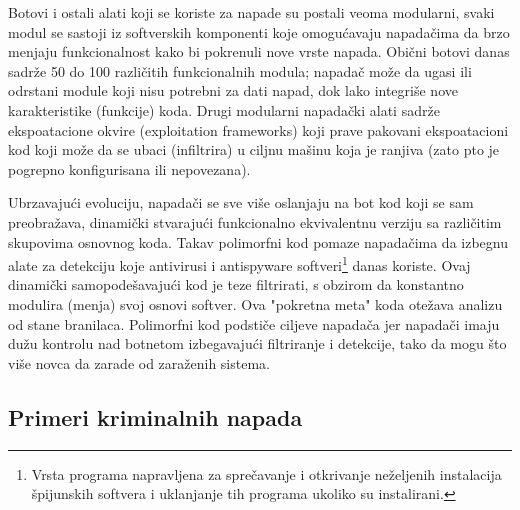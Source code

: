\documentclass[a4paper]{article}
\begin{document}
Botovi i ostali alati koji se koriste za napade su postali veoma modularni, svaki modul se sastoji iz softverskih komponenti koje omogućavaju napadačima da brzo menjaju funkcionalnost kako bi pokrenuli nove vrste napada. Obični botovi danas sadrže 50 do 100 različitih funkcionalnih modula; napadač može da ugasi ili odrstani module koji nisu potrebni za dati napad, dok lako integriše nove karakteristike (funkcije) koda. Drugi modularni napadački alati sadrže ekspoatacione okvire (exploitation  frameworks) koji prave pakovani ekspoatacioni kod koji može da se ubaci (infiltrira) u ciljnu mašinu koja je ranjiva (zato pto je pogrepno konfigurisana ili nepovezana).

Ubrzavajući evoluciju, napadači se sve više oslanjaju na bot kod koji se sam preobražava, dinamički stvarajući funkcionalno ekvivalentnu verziju sa različitim skupovima osnovnog koda. Takav polimorfni kod pomaze napadačima da izbegnu alate za detekciju koje antivirusi i antispyware softveri\footnote{Vrsta programa napravljena za sprečavanje i otkrivanje neželjenih instalacija špijunskih softvera i uklanjanje tih programa ukoliko su instalirani.} danas koriste. Ovaj dinamički samopodešavajući kod je teze filtrirati, s obzirom da konstantno modulira (menja) svoj osnovi softver. Ova "pokretna meta" koda otežava analizu od stane branilaca. Polimorfni kod podstiče ciljeve napadača jer napadači imaju dužu kontrolu nad botnetom izbegavajući filtriranje i detekcije, tako da mogu što više novca da zarade od zaraženih sistema.

\subsection{Primeri kriminalnih napada}
\label{subsec:primeri_krimi_napada}
\end{document}
